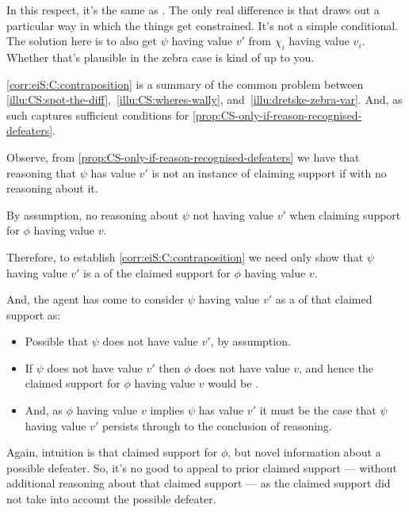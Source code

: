 \begin{note}
{    In this respect, it's the same as \LCS{}.
    The only real difference is that \LCS{} draws out a particular way in which the things get constrained.
    It's not a simple conditional.
  }
  {
    \color{red}
    The solution here is to also get \(\psi\) having value \(v'\) from \(\chi_{i}\) having value \(v_{i}\).
    Whether that's plausible in the zebra case is kind of up to you.
  }

  \autoref{corr:eiS:C:contraposition} is a summary of the common problem between  \ref{illu:CS:spot-the-diff},~\ref{illu:CS:wheres-wally}, and~\ref{illu:dretske-zebra-var}.
  And, as such captures sufficient conditions for \autoref{prop:CS-only-if-reason-recognised-defeaters}.
\end{note}

\begin{note}
  Observe, from \autoref{prop:CS-only-if-reason-recognised-defeaters} we have that reasoning that \(\psi\) has value \(v'\) is not an instance of claiming support {\color{red} if \requ{} with no reasoning about it}.

  By assumption, no reasoning about \(\psi\) not having value \(v'\) when claiming support for \(\phi\) having value \(v\).

  Therefore, to establish \autoref{corr:eiS:C:contraposition} we need only show that \(\psi\) having value \(v'\) is a \requ{} of the claimed support for \(\phi\) having value \(v\).

  And, the agent has come to consider \(\psi\) having value \(v'\) as a \requ{} of that claimed support as:
  \begin{itemize}
  \item Possible that \(\psi\) does not have value \(v'\), by assumption.
  \item If \(\psi\) does not have value \(v'\) then \(\phi\) does not have value \(v\), and hence the claimed support for \(\phi\) having value \(v\) would be \misled{}.
  \item And, as \(\phi\) having value \(v\) implies \(\psi\) has value \(v'\) it must be the case that \(\psi\) having value \(v'\) persists through to the conclusion of reasoning.
  \end{itemize}
\end{note}

\begin{note}
  Again, intuition is that claimed support for \(\phi\), but novel information about a possible defeater.
  So, it's no good to appeal to prior claimed support --- without additional reasoning about that claimed support --- as the claimed support did not take into account the possible defeater.
\end{note}

